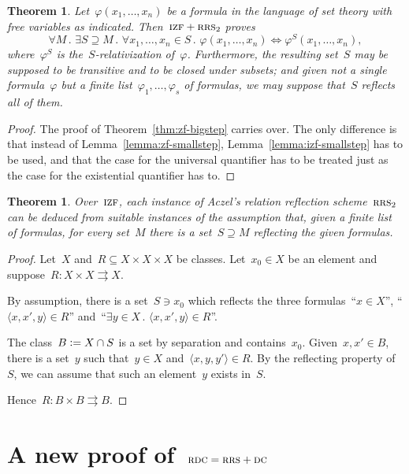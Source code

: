 \documentclass[oneside,reqno]{amsart}
\theoremstyle{definition}
\theoremstyle{plain}
\newtheorem{thm}[defn]{Theorem}
\theoremstyle{remark}
\newcommand{\defeq}{\vcentcolon=}
\renewcommand{\_}{\mathpunct{.}\,}
\newcommand{\?}{\,{:}\,}
\newcommand{\IZF}{\textsc{izf}}
\newcommand{\RRS}{\textsc{rrs}}
\newcommand{\RDC}{\textsc{rdc}}
\newcommand{\DC}{\textsc{dc}}
\begin{document}
\begin{thm}\label{thm:izf-bigstep}
Let~$\varphi(x_1,\ldots,x_n)$ be a formula in the language of set
theory with free variables as indicated. Then~$\IZF+\RRS_2$ proves
\[ \forall M\_
  \exists S \supseteq M\_
  \forall x_1,\ldots,x_n \in S\_
  \varphi(x_1,\ldots,x_n) \Leftrightarrow \varphi^S(x_1,\ldots,x_n), \]
where~$\varphi^S$ is the~$S$-relativization of~$\varphi$.
Furthermore, the resulting set~$S$ may be supposed to be transitive and to be closed
under subsets; and given not a single formula~$\varphi$ but a finite
list~$\varphi_1,\ldots,\varphi_s$ of formulas, we may suppose that~$S$ reflects
all of them.
\end{thm}

\begin{proof}The proof of Theorem~\ref{thm:zf-bigstep} carries over. The only
difference is that instead of Lemma~\ref{lemma:zf-smallstep},
Lemma~\ref{lemma:izf-smallstep} has to be used, and that the case for the
universal quantifier has to be treated just as the case for the existential
quantifier has to.\end{proof}


\begin{thm}\label{thm:refl-entails-rrs2}
Over~$\IZF$, each instance of Aczel's relation reflection scheme~$\RRS_2$ can be
deduced from suitable instances of the assumption that, given a finite list
of formulas, for every set~$M$ there is a set~$S \supseteq M$ reflecting the
given formulas.
\end{thm}

\begin{proof}Let~$X$ and~$R \subseteq X \times X \times X$ be classes. Let~$x_0 \in X$
be an element and suppose~$R : X \times X \rightrightarrows X$.

By assumption, there is a set~$S \ni x_0$ which reflects the three
formulas~``$x \in X$'', ``$\langle x,x',y \rangle \in R$'' and~``$\exists y \in X\_ \langle
x,x',y \rangle \in R$''.

The class~$B \defeq X \cap S$ is a set by separation and contains~$x_0$.
Given~$x,x' \in B$, there is a set~$y$ such that~$y \in X$ and~$\langle x,y,y'
\rangle \in R$. By the reflecting property of~$S$, we can assume that such an
element~$y$ exists in~$S$.

Hence~$R : B \times B \rightrightarrows B$.
\end{proof}


\section{A new proof of~$\RDC = \RRS + \DC$}
\label{sect:appl-rdc}
\end{document}
